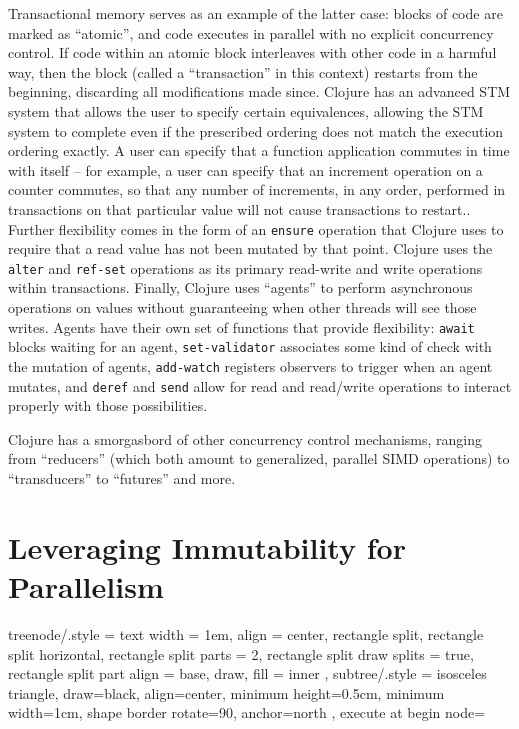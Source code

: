 Transactional memory serves as an example of the latter case: blocks of code are
marked as ``atomic'', and code executes in parallel with no explicit concurrency
control. If code within an atomic block interleaves with other code in a harmful
way, then the block (called a ``transaction'' in this context) restarts from the
beginning, discarding all modifications made since. Clojure has an advanced STM
system that allows the user to specify certain equivalences, allowing the STM
system to complete even if the prescribed ordering does not match the execution
ordering exactly. A user can specify that a function application commutes in time
with itself -- for example, a user can specify that an increment operation on a
counter commutes, so that any number of increments, in any order, performed in
transactions on that particular value will not cause transactions to restart.. Further
flexibility comes in the form of an \texttt{ensure} operation that Clojure uses to
require that a read value has not been mutated by that point. Clojure uses the
\texttt{alter} and \texttt{ref-set} operations as its primary read-write and write
operations within transactions. Finally, Clojure uses ``agents'' to perform
asynchronous operations on values without guaranteeing when other threads will
see those writes. Agents have their own set of functions that provide
flexibility: \texttt{await} blocks waiting for an agent, \texttt{set-validator}
associates some kind of check with the mutation of agents, \texttt{add-watch}
registers observers to trigger when an agent mutates, and \texttt{deref} and
\texttt{send} allow for read and read/write operations to interact properly with
those possibilities.

Clojure has a smorgasbord of other concurrency control mechanisms, ranging from
``reducers'' (which both amount to generalized, parallel SIMD operations) to
``transducers'' to ``futures'' and more.

\section{Leveraging Immutability for Parallelism}
\tikzset
{
    treenode/.style = {
        text width = 1em, align = center, rectangle split,
        rectangle split horizontal,
        rectangle split parts = 2,
        rectangle split draw splits = true,
        rectangle split part align = base,
        draw, fill = inner
    },
    subtree/.style = {
        isosceles triangle, draw=black, align=center,
        minimum height=0.5cm, minimum width=1cm,
        shape border rotate=90, anchor=north
    },
    execute at begin node=\strut
}

